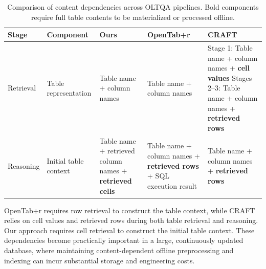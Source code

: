 \begin{table}[t]
\centering
\small
\renewcommand{\arraystretch}{1.2}

\begin{tabularx}{\textwidth}{
    >{\raggedright\arraybackslash}p{1.4cm}
    >{\raggedright\arraybackslash}p{2.7cm}
    >{\raggedright\arraybackslash}p{3.4cm}
    >{\raggedright\arraybackslash}p{3.5cm}
    >{\raggedright\arraybackslash}X
}
\hline
\textbf{Stage} &
\textbf{Component} &
\textbf{Ours} &
\textbf{OpenTab+r} &
\textbf{CRAFT} \\
\hline

Retrieval &
Table representation &
Table name + column names &
Table name + column names &
Stage 1: Table name + column names + \textbf{cell values}
\newline
Stages 2--3: Table name + column names +
\newline \textbf{retrieved rows} \\
\hline

Reasoning &
Initial table context &
Table name +
\newline retrieved column names +
\newline \textbf{retrieved cells} &
Table name + column names + \textbf{retrieved rows} +
\newline SQL execution result &
Table name + column names + \textbf{retrieved rows} \\
\hline

\end{tabularx}

\caption{Comparison of content dependencies across OLTQA pipelines.
Bold components require full table contents to be materialized or processed offline.}
\label{tab:practical_constraints}
\end{table}

OpenTab+r requires row retrieval to construct the table context, while CRAFT relies on cell values and retrieved rows during both table retrieval and reasoning.
Our approach requires cell retrieval to construct the initial table context.
These dependencies become practically important in a large, continuously updated database, where maintaining content-dependent offline preprocessing and indexing can incur substantial storage and engineering costs.


